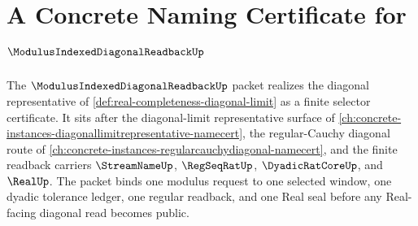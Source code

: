 \chapter{A Concrete Naming Certificate for $\ModulusIndexedDiagonalReadbackUp$}
\label{ch:concrete-instances-modulus-indexed-diagonal-readback-namecert}

The $\ModulusIndexedDiagonalReadbackUp$ packet realizes the diagonal representative of \autoref{def:real-completeness-diagonal-limit} as a finite selector certificate. It sits after the diagonal-limit representative surface of \autoref{ch:concrete-instances-diagonallimitrepresentative-namecert}, the regular-Cauchy diagonal route of \autoref{ch:concrete-instances-regularcauchydiagonal-namecert}, and the finite readback carriers $\StreamNameUp$, $\RegSeqRatUp$, $\DyadicRatCoreUp$, and $\RealUp$. The packet binds one modulus request to one selected window, one dyadic tolerance ledger, one regular readback, and one Real seal before any Real-facing diagonal read becomes public.

